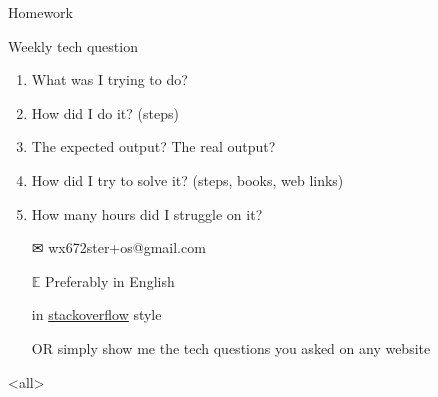 \begin{frame}{{\hw\quad}Homework}
  \begin{block}{Weekly tech question}
    \begin{enumerate}
    \item What was I trying to do?
    \item How did I do it? (steps)
    \item The expected output? The real output?
    \item How did I try to solve it? (steps, books, web links)
    \item How many hours did I struggle on it?
    \end{enumerate}
  \end{block}
  \begin{itemize}
  \item[\Large\dejavu ✉] {\ttfamily wx672ster+os@gmail.com}
  \item[$\mathbb{E}$] Preferably in English
  \item[\stackoverflow] in
    \href{https://stackoverflow.com/questions/39199299/what-is-the-essential-difference-between-compound-command-and-normal-command-inlink}{stackoverflow}
    style
  \item[OR] simply show me the tech questions you asked on any website
  \end{itemize}  
\end{frame}

\mode<all>
